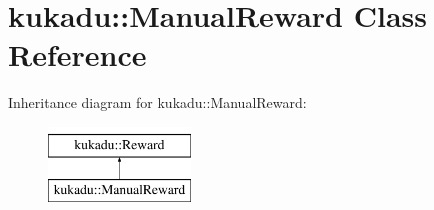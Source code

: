 \hypertarget{classkukadu_1_1ManualReward}{\section{kukadu\-:\-:Manual\-Reward Class Reference}
\label{classkukadu_1_1ManualReward}
}
Inheritance diagram for kukadu\-:\-:Manual\-Reward\-:\begin{figure}[H]
\begin{center}
\leavevmode
\includegraphics[height=2.000000cm]{classkukadu_1_1ManualReward}
\end{center}
\end{figure}
